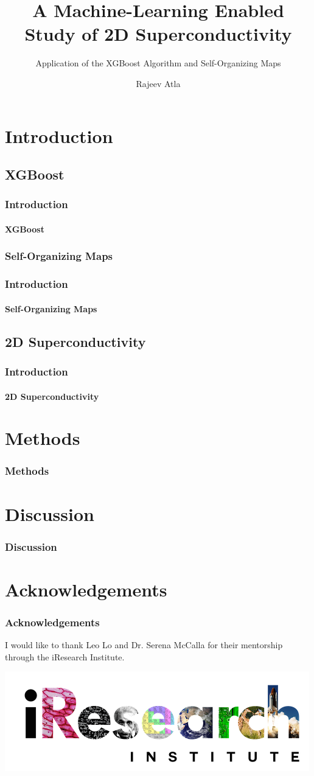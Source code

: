 \documentclass[12pt]{beamer}
\title{A Machine-Learning Enabled Study of 2D Superconductivity}
\subtitle{Application of the XGBoost Algorithm and Self-Organizing Maps}
\author[Rajeev Atla] %
{Rajeev Atla }
\institute[JPS] %
{
  John P. Stevens High School
}
\begin{document}
\frame{\titlepage}

\section{Introduction}
\subsection{XGBoost}


\begin{frame}
\frametitle{Introduction}
\framesubtitle{XGBoost}


\end{frame}

\subsubsection{Self-Organizing Maps}

\begin{frame}
\frametitle{Introduction}
\framesubtitle{Self-Organizing Maps}

\end{frame}

\subsection{2D Superconductivity}

\begin{frame}
\frametitle{Introduction}
\framesubtitle{2D Superconductivity}

\end{frame}




\section{Methods}

\begin{frame}
\frametitle{Methods}

\end{frame}



\section{Discussion}

\begin{frame}
\frametitle{Discussion}

\end{frame}

\section{Acknowledgements}

\begin{frame}
\frametitle{Acknowledgements}
I would like to thank Leo Lo and Dr. Serena McCalla for their mentorship through the iResearch Institute.

\includegraphics[scale = 0.55]{iresearch.png}


\end{frame}
\end{document}
